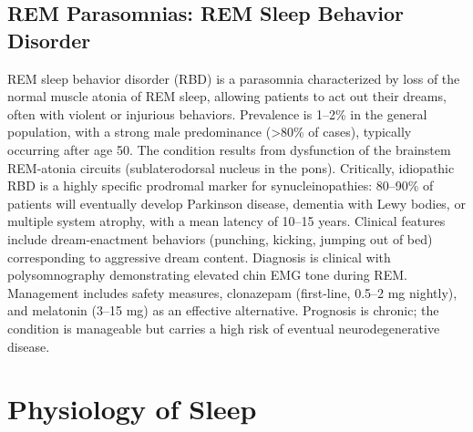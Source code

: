 \subsection{REM Parasomnias: REM Sleep Behavior Disorder}
\label{sec:REM Sleep Behavior Disorder}
REM sleep behavior disorder (RBD) is a parasomnia characterized by loss of the normal muscle atonia of REM sleep, allowing patients to act out their dreams, often with violent or injurious behaviors. Prevalence is 1--2\% in the general population, with a strong male predominance (>80\% of cases), typically occurring after age 50. The condition results from dysfunction of the brainstem REM-atonia circuits (sublaterodorsal nucleus in the pons). Critically, idiopathic RBD is a highly specific prodromal marker for synucleinopathies: 80--90\% of patients will eventually develop Parkinson disease, dementia with Lewy bodies, or multiple system atrophy, with a mean latency of 10--15 years. Clinical features include dream-enactment behaviors (punching, kicking, jumping out of bed) corresponding to aggressive dream content. Diagnosis is clinical with polysomnography demonstrating elevated chin EMG tone during REM. Management includes safety measures, clonazepam (first-line, 0.5--2 mg nightly), and melatonin (3--15 mg) as an effective alternative. Prognosis is chronic; the condition is manageable but carries a high risk of eventual neurodegenerative disease.

\section{Physiology of Sleep}








